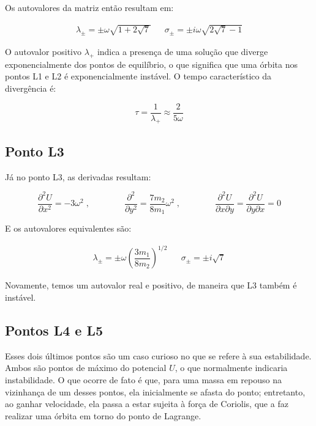 \vspace{10px}

Os autovalores da matriz então resultam em:

\vspace{-13px}

\begin{align}
\lambda_{\pm} = \pm \omega \sqrt{1+2\sqrt{7}} && \sigma_{\pm} = \pm i\omega \sqrt{2\sqrt{7}-1}
\end{align}

O autovalor positivo $\lambda_+$ indica a presença de uma solução que diverge exponencialmente dos pontos de equilíbrio, o que significa que uma órbita nos pontos L1 e L2 é exponencialmente instável. O tempo característico da divergência é:

\begin{equation}
\tau = \frac{1}{\lambda_+} \approx \frac{2}{5\omega}
\end{equation}

\subsection{Ponto L3}

Já no ponto L3, as derivadas resultam:

\begin{equation}
\dfrac{\partial ^2U}{\partial x^2} = -3\omega^2 \;, \qquad \qquad \dfrac{\partial ^2}{\partial y^2} = \frac{7m_2}{8m_1}\omega^2 \;, \qquad \qquad \dfrac{\partial ^2U}{\partial x\partial y} = \dfrac{\partial ^2U}{\partial y\partial x} = 0
\end{equation}

E os autovalores equivalentes são:

\begin{align}
\lambda_{\pm} = \pm \omega \left(\dfrac{3m_1}{8m_2}\right)^{1/2} && \sigma_{\pm} = \pm i\sqrt{7}
\end{align}

Novamente, temos um autovalor real e positivo, de maneira que L3 também é instável.

\subsection{Pontos L4 e L5}

Esses dois últimos pontos são um caso curioso no que se refere à sua estabilidade. Ambos são pontos de máximo do potencial $U$, o que normalmente indicaria instabilidade. O que ocorre de fato é que, para uma massa em repouso na vizinhança de um desses pontos, ela inicialmente se afasta do ponto; entretanto, ao ganhar velocidade, ela passa a estar sujeita à força de Coriolis, que a faz realizar uma órbita em torno do ponto de Lagrange.

